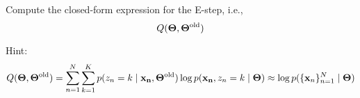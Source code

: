 Compute the closed-form expression for the E-step, i.e., 
\[Q(\bold{\Theta}, \bold{\Theta}^{\text{old}})\]

Hint: 
\begin{align*}
    Q(\bold{\Theta}, \bold{\Theta}^{\text{old}}) = \sum_{n=1}^N \sum_{k=1}^K p(z_n = k \mid \bold{x_n},\bold{\Theta}^{\text{old}}) \operatorname{log}p(\bold{x_n}, z_n = k \mid \bold{\Theta}) \approx \log p(\{\bold{x}_n\}_{n=1}^N \mid \bold{\Theta})
\end{align*}